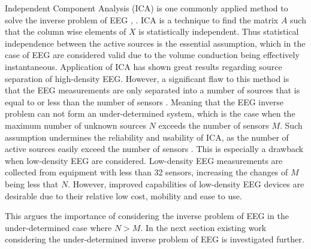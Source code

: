 Independent Component Analysis (ICA) is one commonly applied method to solve the inverse problem of EEG \cite{Scott1996}, \cite{Scott1997}. ICA is a technique to find the matrix $A$ such that the column wise elements of $X$ is statistically independent. Thus statistical independence between the active sources is the essential assumption, which in the case of EEG are considered valid due to the volume conduction being effectively instantaneous\cite[p. 3]{Scott1997}. 
Application of ICA has shown great results regarding source separation of high-density EEG. 
However, a significant flaw to this method is that the EEG measurements are only separated into a number of sources that is equal to or less than the number of sensors \cite{Balkan2015}.
Meaning that the EEG inverse problem can not form an under-determined system, which is the case when the maximum number of unknown sources $N$ exceeds the number of sensors $M$. 
Such assumption undermines the reliability and usability of ICA, as the number of active sources easily exceed the number of sensors \cite{phd2015}. 
This is especially a drawback when low-density EEG are considered. Low-density EEG measurements are collected from equipment with less than 32 sensors, increasing the changes of $M$ being less that $N$. 
However, improved capabilities of low-density EEG devices are desirable due to their relative low cost, mobility and ease to use. 

This argues the importance of considering the inverse problem of EEG in the under-determined case where $N>M$. In the next section existing work considering the under-determined inverse problem of EEG is investigated further. 


